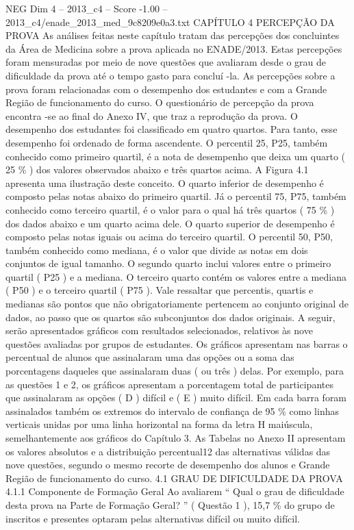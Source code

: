 \begin{textsample}{NEG Dim 4 – 2013\_c4 – Score -1.00 – 2013\_c4/enade\_2013\_med\_9c8209e0a3.txt}  \label{ex:f4_neg_125}
CAPÍTULO 4 PERCEPÇÃO DA PROVA As análises feitas neste capítulo tratam das percepções dos concluintes da Área de Medicina sobre a prova aplicada no ENADE/2013.
Estas percepções foram mensuradas por meio de nove questões que avaliaram desde o grau de dificuldade da prova até o tempo gasto para concluí -la.
As percepções sobre a prova foram relacionadas com o desempenho dos estudantes e com a Grande Região de funcionamento do curso.
O questionário de percepção da prova encontra -se ao final do Anexo IV, que traz a reprodução da prova.
O desempenho dos estudantes foi classificado em quatro quartos.
Para tanto, esse desempenho foi ordenado de forma ascendente.
O percentil 25, P25, também conhecido como primeiro quartil, é a nota de desempenho que deixa um quarto ( 25 \% ) dos valores observados abaixo e três quartos acima.
A Figura 4.1 apresenta uma ilustração deste conceito.
O quarto inferior de desempenho é composto pelas notas abaixo do primeiro quartil.
Já o percentil 75, P75, também conhecido como terceiro quartil, é o valor para o qual há três quartos ( 75 \% ) dos dados abaixo e um quarto acima dele.
O quarto superior de desempenho é composto pelas notas iguais ou acima do terceiro quartil.
O percentil 50, P50, também conhecido como mediana, é o valor que divide as notas em dois conjuntos de igual tamanho.
O segundo quarto inclui valores entre o primeiro quartil ( P25 ) e a mediana.
O terceiro quarto contém os valores entre a mediana ( P50 ) e o terceiro quartil ( P75 ).
Vale ressaltar que percentis, quartis e medianas são pontos que não obrigatoriamente pertencem ao conjunto original de dados, ao passo que os quartos são subconjuntos dos dados originais.
A seguir, serão apresentados gráficos com resultados selecionados, relativos às nove questões avaliadas por grupos de estudantes.
Os gráficos apresentam nas barras o percentual de alunos que assinalaram uma das opções ou a soma das porcentagens daqueles que assinalaram duas ( ou três ) delas.
Por exemplo, para as questões 1 e 2, os gráficos apresentam a porcentagem total de participantes que assinalaram as opções ( D ) difícil e ( E ) muito difícil.
Em cada barra foram assinalados também os extremos do intervalo de confiança de 95 \% como linhas verticais unidas por uma linha horizontal na forma da letra H maiúscula, semelhantemente aos gráficos do Capítulo 3.
As Tabelas no Anexo II apresentam os valores absolutos e a distribuição percentual12 das alternativas válidas das nove questões, segundo o mesmo recorte de desempenho dos alunos e Grande Região de funcionamento do curso. 4.1 GRAU DE DIFICULDADE DA PROVA 4.1.1 Componente de Formação Geral Ao avaliarem “ Qual o grau de dificuldade desta prova na Parte de Formação Geral? ” ( Questão 1 ), 15,7 \% do grupo de inscritos e presentes optaram pelas alternativas difícil ou muito difícil.

\end{textsample}
